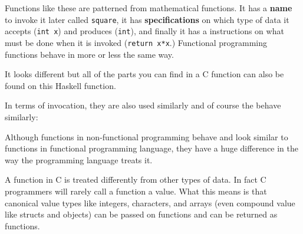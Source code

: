 \begin{Shaded}
\begin{Highlighting}[]
\OperatorTok{(}\OperatorTok{)\{}
    \OperatorTok{*}\OperatorTok{;}
\OperatorTok{\}}
\end{Highlighting}
\end{Shaded}

Functions like these are patterned from mathematical functions. It has a
\textbf{name} to invoke it later called \texttt{square}, it has
\textbf{specifications} on which type of data it accepts
(\texttt{int\ x}) and produces (\texttt{int}), and finally it has a
instructions on what must be done when it is invoked
(\texttt{return\ x*x}.) Functional programming functions behave in more
or less the same way.

\begin{Shaded}
\begin{Highlighting}[]
  \OtherTok{{-}\textgreater{}} 
\OtherTok{=}\OperatorTok{*}
\end{Highlighting}
\end{Shaded}

It looks different but all of the parts you can find in a C function can
also be found on this Haskell function.

In terms of invocation, they are also used similarly and of course the
behave similarly:

\begin{Shaded}
\begin{Highlighting}[]
\OperatorTok{(}\OperatorTok{);}
\end{Highlighting}
\end{Shaded}

\begin{Shaded}
\begin{Highlighting}[]
\end{Highlighting}
\end{Shaded}

Although functions in non-functional programming behave and look similar
to functions in functional programming language, they have a huge
difference in the way the programming language treats it.

A function in C is treated differently from other types of data. In fact
C programmers will rarely call a function a value. What this means is
that canonical value types like integers, characters, and arrays (even
compound value like structs and objects) can be passed on functions and
can be returned as functions.

